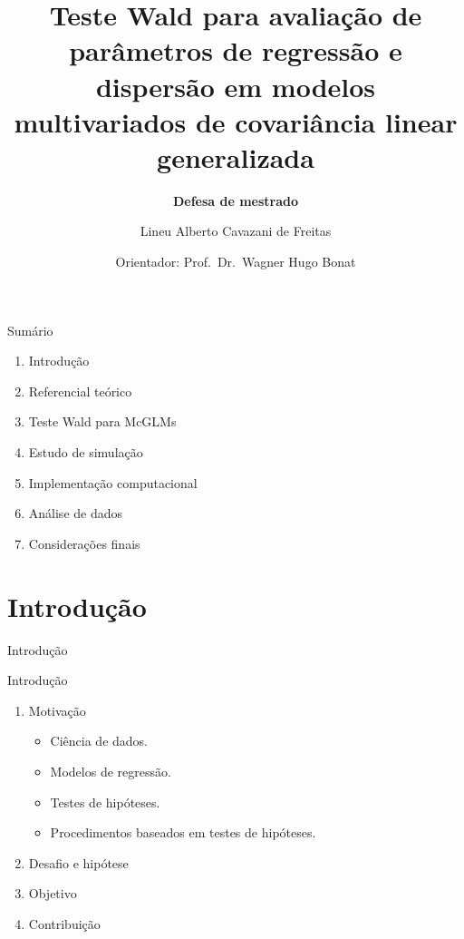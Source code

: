 \documentclass[
  ignorenonframetext,
  serif,
  professionalfont,
  usenames,
  dvipsnames,
  aspectratio = 169]{beamer}
\title{\textbf{Teste Wald para avaliação de parâmetros de regressão e dispersão em modelos multivariados de covariância linear generalizada}\newline}
\subtitle{\textbf{Defesa de mestrado}}
\author{Lineu Alberto Cavazani de Freitas\newline \and Orientador:
Prof.~Dr.~Wagner Hugo Bonat}
\date{}
\institute{PPG Informática UFPR}
\begin{document}
\frame{\titlepage}

\begin{frame}
\end{frame}

\begin{frame}{Sumário}
\protect\hypertarget{sumuxe1rio}{}
\begin{enumerate}
  \item Introdução
  \item Referencial teórico
  
  \item Teste Wald para McGLMs
  \item Estudo de simulação
  \item Implementação computacional
  \item Análise de dados
  \item Considerações finais
\end{enumerate}
\end{frame}

\hypertarget{introduuxe7uxe3o}{%
\section{Introdução}\label{introduuxe7uxe3o}}

\begin{frame}{Introdução}
\end{frame}

\begin{frame}{Introdução}
\protect\hypertarget{introduuxe7uxe3o-1}{}
\begin{enumerate}
    \itemsep 2ex
    
  \item Motivação
    \begin{itemize}
      \item Ciência de dados.
      \item Modelos de regressão.
      \item Testes de hipóteses.
      \item Procedimentos baseados em testes de hipóteses.
    \end{itemize}
    
  \item Desafio e hipótese
 
  \item Objetivo
 
  \item Contribuição

\end{enumerate}
\end{frame}
\end{document}
